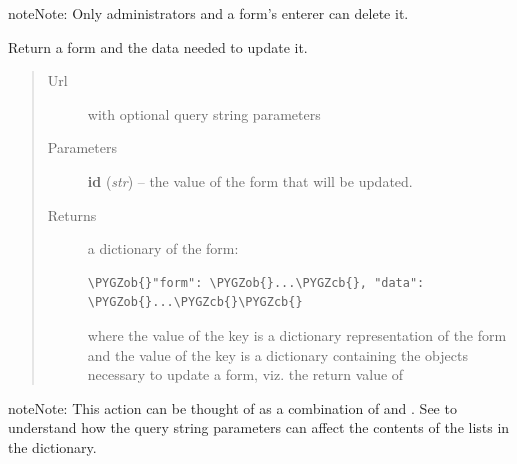 \documentclass[letterpaper,10pt,english]{sphinxmanual}
\def\PYGZob{\char`\{}
\def\PYGZcb{\char`\}}
\begin{document}
\begin{fulllineitems}
\begin{fulllineitems}
\begin{quote}
\begin{description}
\end{description}\end{quote}

\begin{notice}{note}{Note:}
Only administrators and a form's enterer can delete it.
\end{notice}

\end{fulllineitems}


\begin{fulllineitems}
\label{api:onlinelinguisticdatabase.controllers.forms.FormsController.edit}
Return a form and the data needed to update it.
\begin{quote}\begin{description}
\item[{Url }] \leavevmode
{} with optional query string parameters

\item[{Parameters}] \leavevmode
\textbf{id} (\emph{str}) -- the  value of the form that will be updated.

\item[{Returns}] \leavevmode

a dictionary of the form:

\begin{Verbatim}[commandchars=\\\{\}]
\PYGZob{}"form": \PYGZob{}...\PYGZcb{}, "data": \PYGZob{}...\PYGZcb{}\PYGZcb{}
\end{Verbatim}

where the value of the  key is a dictionary representation
of the form and the value of the  key is a dictionary
containing the objects necessary to update a form, viz. the return
value of 


\end{description}\end{quote}

\begin{notice}{note}{Note:}
This action can be thought of as a combination of
 and .  See
 to understand how the query string
parameters can affect the contents of the lists in the 
dictionary.
\end{notice}


\end{fulllineitems}
\end{fulllineitems}
\end{document}
